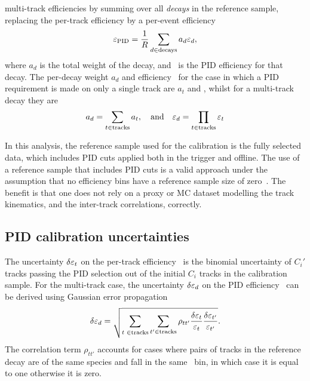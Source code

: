 multi-track efficiencies by summing over all \emph{decays} in the reference 
sample, replacing the per-track efficiency by a per-event efficiency 
\effpiddecay
\begin{equation}
  \varepsilon_{\textnormal{PID}} = \frac{1}{R}\sum_{d\in\text{decays}} a_{d}\varepsilon_{d},
\end{equation}
where $a_{d}$ is the total weight of the decay, and \effpiddecay\ is the 
\ac{PID} efficiency for that decay.
The per-decay weight $a_{d}$ and efficiency \effpiddecay\ for the case in which 
a \ac{PID} requirement is made on only a single track are $a_{t}$ and 
\effpidtrack, whilst for a multi-track decay they are
\begin{equation}
  a_{d} = \sum_{t \in \textnormal{tracks}} a_{t},
  \quad\textnormal{and}\quad
  \varepsilon_{d} = \prod_{t \in \textnormal{tracks}} \varepsilon_{t}
\end{equation}

In this analysis, the reference sample used for the calibration is the fully 
selected data, which includes \ac{PID} cuts applied both in the trigger and 
offline.
The use of a reference sample that includes \ac{PID} cuts is a valid approach 
under the assumption that no efficiency bins have a reference sample size of 
zero~\cite{Anderlini:2202412}.
The benefit is that one does not rely on a proxy or \ac{MC} dataset modelling 
the track kinematics, and the inter-track correlations, correctly.

\subsection{\ac{PID} calibration uncertainties}
\label{chap:prod:effs:pid:uncertainties}

The uncertainty $\delta{\ensuremath{\varepsilon_{t}}}$ on the per-track efficiency \effpidtrack\ 
is the binomial uncertainty of $C_{i}'$ tracks passing the \ac{PID} selection 
out of the initial $C_{i}$ tracks in the calibration sample.
For the multi-track case, the uncertainty $\delta{\ensuremath{\varepsilon_{d}}}$ on the \ac{PID} 
efficiency \effpiddecay\ can be derived using Gaussian error propagation
\begin{equation}
  \unc{\effpiddecay} = \sqrt{%
    \sum_{t\phantom{'}\in\text{tracks}}\sum_{t'\in\text{tracks}}
      \rho_{tt'}
      \frac{%
        \unc{\effpidtrack}
      }{%
        \effpidtrack
      }
      \frac{%
        \unc{\eff_{t'}}
      }{%
        \eff_{t'}
      }
  }.
  \label{eqn:prod:effs:pid:decay_uncertainty}
\end{equation}
The correlation term $\rho_{tt'}$ accounts for cases where pairs of tracks in 
the reference decay are of the same species and fall in the same \ptotetanspd\ 
bin, in which case it is equal to one otherwise it is zero.

